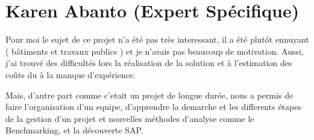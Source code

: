 \section{Karen Abanto (Expert Spécifique)}

Pour moi le sujet de ce projet n'a été pas très interessant, il a été plutôt
 ennuyant ( bâtiments et travaux publics )
et je n'avais pas beaucoup de motivation. Aussi, j'ai trouvé des 
difficultés lors la réalisation de la solution 
et à l'estimation des coûts du à la manque d'expérience. 

Mais, d'autre part comme c'etait un projet de longue durée, nous a permis de 
faire l'organisation d'un equipe, 
d'apprendre la demarche et les differents étapes de la gestion d'un projet 
et nouvelles méthodes d'analyse
comme le Benchmarking, et la découverte SAP.






